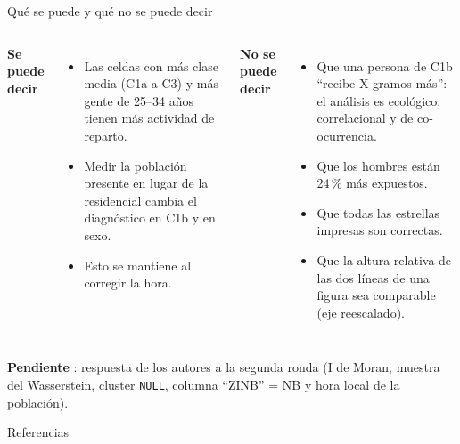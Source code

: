 \documentclass[aspectratio=169,10pt,t]{beamer}
\begin{document}
\begin{frame}{Qué se puede y qué no se puede decir}
  \begin{columns}[T]
    \textbf{Se puede decir}
    \footnotesize
    \begin{itemize}
      \item Las celdas con más clase media (C1a a C3) y más gente de 25--34 años tienen más actividad de reparto.
      \item Medir la población presente en lugar de la residencial cambia el diagnóstico en C1b y en sexo.
      \item Esto se mantiene al corregir la hora.
    \end{itemize}
    \textbf{No se puede decir}
    \footnotesize
    \begin{itemize}
      \item Que una persona de C1b ``recibe X gramos más'': el análisis es ecológico, correlacional y de co-ocurrencia.
      \item Que los hombres están 24\,\% más expuestos.
      \item Que todas las estrellas impresas son correctas.
      \item Que la altura relativa de las dos líneas de una figura sea comparable (eje reescalado).
    \end{itemize}
  \end{columns}
  \vspace{6pt}

  \textbf{Pendiente} \footnotesize: respuesta de los autores a la segunda ronda (I de Moran, muestra del Wasserstein, cluster \texttt{NULL}, columna ``ZINB'' = NB y hora local de la población).
\end{frame}

\begin{frame}{Referencias}
  \footnotesize
  \vspace{6pt}
  \printbibliography
\end{frame}
\end{document}
